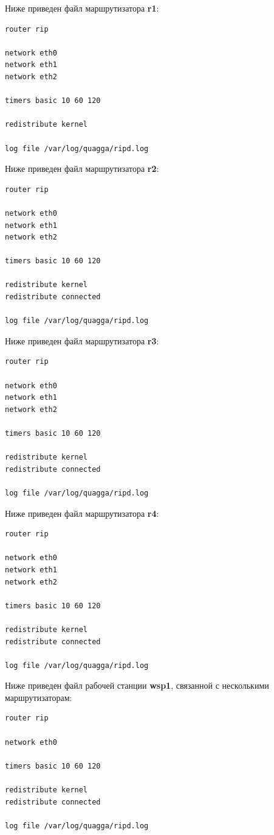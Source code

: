 \documentclass[a4paper,12pt]{article}
\begin{document}
Ниже приведен файл  маршрутизатора \textbf{r1}:

\begin{Verbatim}
router rip

network eth0
network eth1
network eth2

timers basic 10 60 120

redistribute kernel

log file /var/log/quagga/ripd.log
\end{Verbatim}

Ниже приведен файл  маршрутизатора \textbf{r2}:

\begin{Verbatim}
router rip

network eth0
network eth1
network eth2

timers basic 10 60 120

redistribute kernel
redistribute connected

log file /var/log/quagga/ripd.log
\end{Verbatim}

Ниже приведен файл  маршрутизатора \textbf{r3}:

\begin{Verbatim}
router rip

network eth0
network eth1
network eth2

timers basic 10 60 120

redistribute kernel
redistribute connected

log file /var/log/quagga/ripd.log
\end{Verbatim}

Ниже приведен файл  маршрутизатора \textbf{r4}:

\begin{Verbatim}
router rip

network eth0
network eth1
network eth2

timers basic 10 60 120

redistribute kernel
redistribute connected

log file /var/log/quagga/ripd.log
\end{Verbatim}

Ниже приведен файл  рабочей станции \textbf{wsp1}, связанной с несколькими маршрутизаторам:

\begin{Verbatim}
router rip

network eth0

timers basic 10 60 120

redistribute kernel
redistribute connected

log file /var/log/quagga/ripd.log
\end{Verbatim}
\end{document}
